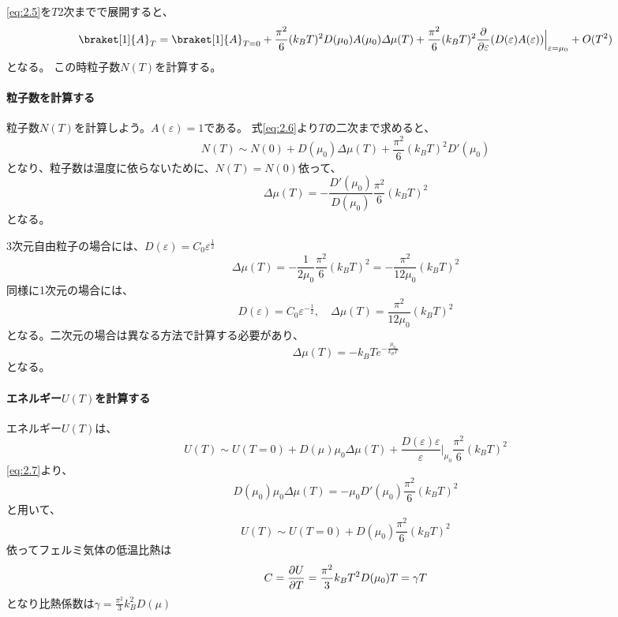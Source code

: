 \documentclass[titlepage]{ltjsarticle}
\newcommand{\ev}[1]{\braket[1]{#1}}
\begin{document}
\eqref{eq:2.5}を\(T\)2次までで展開すると、
\begin{equation}\label{eq:2.6}
  \ev{A}_T = \ev{A}_{T=0} + \frac{\pi^2}{6}(k_BT)^2 D(\mu_0)A(\mu_0)\varDelta \mu(T) + \frac{\pi^2}{6}(k_BT)^2 \pdv{}{\varepsilon}(D(\varepsilon)A(\varepsilon))\Big|_{\varepsilon=\mu_0} + O(T^2)
\end{equation}
となる。
この時粒子数\(N(T)\)を計算する。

\paragraph{粒子数を計算する}
粒子数\(N(T)\)を計算しよう。\(A(\varepsilon)=1\)である。
式\eqref{eq:2.6}より\(T\)の二次まで求めると、
\begin{equation}
  N(T) \sim N(0) + D(\mu_0)\Delta \mu(T) + \frac{\pi^2}{6}(k_BT)^2 D'(\mu_0)
\end{equation}
となり、粒子数は温度に依らないために、\(N(T)=N(0)\)依って、
\begin{equation}\label{eq:2.7}
  \varDelta \mu(T) = -\frac{D'(\mu_0)}{D(\mu_0)}\frac{\pi^2}{6}(k_BT)^2
\end{equation}
となる。


3次元自由粒子の場合には、\(D(\varepsilon)=C_0\varepsilon^{\frac{1}{2}}\)
\begin{equation}
  \varDelta \mu(T) = -\frac{1}{2\mu_0} \frac{\pi^2}{6}(k_BT)^2 = -\frac{\pi^2}{12\mu_0}(k_BT)^2
\end{equation}
同様に1次元の場合には、
\begin{equation}
  D(\varepsilon) = C_0\varepsilon^{-\frac{1}{2}} , \quad \varDelta \mu(T) = \frac{\pi^2}{12 \mu_0}(k_BT)^2
\end{equation}
となる。二次元の場合は異なる方法で計算する必要があり、
\begin{equation}
  \varDelta \mu(T) = -k_BT e^{-\frac{\mu_0}{k_BT}}
\end{equation}
となる。

\paragraph{エネルギー\(U(T)\)を計算する}
エネルギー\(U(T)\)は、
\begin{equation}
  U(T) \sim U(T=0) + D(\mu)\mu_0 \varDelta \mu(T) + \frac{D(\varepsilon)\varepsilon}{\varepsilon}\Big|_{\mu_0}\frac{\pi^2}{6}(k_BT)^2
\end{equation}
\eqref{eq:2.7}より、
\begin{equation}
  D(\mu_0)\mu_0 \varDelta \mu(T) = -\mu_0 D'(\mu_0)\frac{\pi^2}{6}(k_BT)^2
\end{equation}
と用いて、
\begin{equation}
  U(T) \sim U(T=0) + D(\mu_0) \frac{\pi^2}{6}(k_BT)^2 
\end{equation}
依ってフェルミ気体の低温比熱は
\begin{equation}
  C = \pdv{U}{T} = \frac{\pi^2}{3}k_BT^2 D(\mu_0) T = \gamma T 
\end{equation}
となり比熱係数は\(\gamma = \frac{\pi^2}{3}k_B^2 D(\mu)\)
\end{document}
